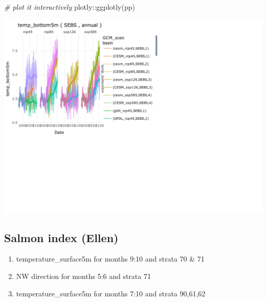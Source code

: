 \documentclass[
]{article}
\newenvironment{Shaded}{\begin{snugshade}}{\end{snugshade}}
\newcommand{\CommentTok}[1]{\textcolor[rgb]{0.56,0.35,0.01}{\textit{#1}}}
\newcommand{\FunctionTok}[1]{\textcolor[rgb]{0.00,0.00,0.00}{#1}}
\newcommand{\NormalTok}[1]{#1}
\newcommand{\SpecialCharTok}[1]{\textcolor[rgb]{0.00,0.00,0.00}{#1}}
\providecommand{\tightlist}{%
  \setlength{\itemsep}{0pt}\setlength{\parskip}{0pt}}
\begin{document}
\begin{Shaded}
\begin{Highlighting}[]
  \CommentTok{\# plot it interactively}
\NormalTok{  plotly}\SpecialCharTok{::}\FunctionTok{ggplotly}\NormalTok{(pp)}
\end{Highlighting}
\end{Shaded}

\begin{center}\includegraphics{ACLIM2_quickStart_files/figure-latex/unnamed-chunk-7-1} \end{center}

\hypertarget{salmon-index-ellen}{%
\subsection{Salmon index (Ellen)}\label{salmon-index-ellen}}

\begin{enumerate}
\def\labelenumi{\arabic{enumi}.}
\tightlist
\item
  temperature\_surface5m for months 9:10 and strata 70 \& 71\\
\item
  NW direction for months 5:6 and strata 71\\
\item
  temperature\_surface5m for months 7:10 and strata 90,61,62
\end{enumerate}
\end{document}
